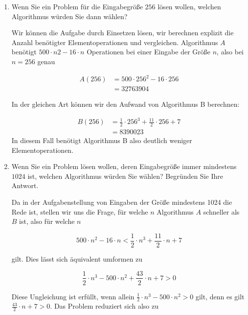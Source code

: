 \documentclass{bschlangaul-aufgabe}
\begin{document}
\begin{enumerate}


\item Wenn Sie ein Problem für die Eingabegröße $256$ lösen wollen,
welchen Algorithmus würden Sie dann wählen?

\begin{liAntwort}
Wir können die Aufgabe durch Einsetzen lösen, \dh wir berechnen explizit
die Anzahl benötigter Elementoperationen und vergleichen. Algorithmus
$A$ benötigt $500 \cdot n 2 -16 \cdot n$ Operationen bei einer Eingabe
der Größe $n$, also bei $n = 256$ genau

\begin{align*}
A(256)
&= 500 \cdot 256^2 - 16 \cdot 256 \\
&= 32763904
\end{align*}

In der gleichen Art können wir den Aufwand von Algorithmus B berechnen:

\begin{align*}
B(256)
&= \frac{1}{2} \cdot 256^3 + \frac{11}{2} \cdot 256 + 7 \\
&= 8390023
\end{align*}
In diesem Fall benötigt Algorithmus B also deutlich weniger Elementoperationen.
\end{liAntwort}


\item Wenn Sie ein Problem lösen wollen, deren Eingabegröße immer
mindestens $1024$ ist, welchen Algorithmus würden Sie wählen? Begründen
Sie Ihre Antwort.

\begin{liAntwort}
Da in der Aufgabenstellung von Eingaben der Größe mindestens 1024 die
Rede ist, stellen wir uns die Frage, für welche $n$ Algorithmus $A$
schneller als $B$ ist, also für welche $n$

\begin{displaymath}
500 \cdot n^2 - 16 \cdot n < \frac{1}{2} \cdot n^3 + \frac{11}{2} \cdot n + 7
\end{displaymath}

gilt. Dies lässt sich äquivalent umformen zu

\begin{displaymath}
\frac{1}{2} \cdot n^3 - 500 \cdot n^2 + \frac{43}{2} \cdot n + 7 > 0
\end{displaymath}

Diese Ungleichung ist erfüllt, wenn allein $\frac{1}{2} \cdot n^3 - 500
\cdot n^2 > 0$ gilt, denn es gilt $\frac{43}{2} \cdot n + 7 > 0$. Das
Problem reduziert sich also zu


\end{liAntwort}
\end{enumerate}
\end{document}
